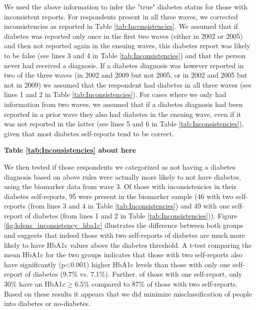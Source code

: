 \documentclass[12pt,english]{article}
\begin{document}
\begin{appendix}
We used the above information to infer the "true" diabetes status for those with inconsistent reports. For respondents present in all three waves, we corrected inconsistencies as reported in Table \ref{tab:Inconsistencies}. We assumed that if diabetes was reported only once in the first two waves (either in 2002 or 2005) and then not reported again in the ensuing waves, this diabetes report was likely to be false (see lines 3 and 4 in Table \ref{tab:Inconsistencies}) and that the person never had received a diagnosis. If a diabetes diagnosis was however reported in two of the three waves (in 2002 and 2009 but not 2005, or in 2002 and 2005 but not in 2009) we assumed that the respondent had diabetes in all three waves (see lines 1 and 2 in Table \ref{tab:Inconsistencies}). For cases where we only had information from two waves, we assumed that if a diabetes diagnosis had been reported in a prior wave they also had diabetes in the ensuing wave, even if it was not reported in the latter (see lines 5 and 6 in Table \ref{tab:Inconsistencies}), given that most diabetes self-reports tend to be correct.


\begin{center}
	\textbf{Table \ref{tab:Inconsistencies} about here}
\end{center}




We then tested if those respondents we categorized as not having a diabetes diagnosis based on above rules were actually more likely to not have diabetes, using the biomarker data from wave 3. Of those with inconsistencies in their diabetes self-reports, 95 were present in the biomarker sample (46 with two self-reports (from lines 3 and 4 in Table \ref{tab:Inconsistencies}) and 49 with one self-report of diabetes (from lines 1 and 2 in Table \ref{tab:Inconsistencies})). Figure \ref{fig:kdens_inconsistency_hba1c} illustrates the difference between both groups and suggests that indeed those with two self-reports of diabetes are much more likely to have \ac{HbA1c} values above the diabetes threshold. A t-test comparing the mean \ac{HbA1c} for the two groups indicates that those with two self-reports also have significantly (p<0.001) higher \ac{HbA1c} levels than those with only one self-report of diabetes (9.7\% vs. 7.1\%). Further, of those with one self-report,  only 30\% have an \ac{HbA1c}$\geq6.5$\% compared to 87\% of those with two self-reports. Based on these results it appears that we did minimize misclassification of people into diabetes or no-diabetes. 


\end{appendix}
\end{document}
